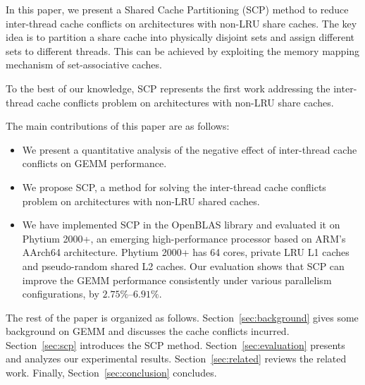 In this paper, we present a Shared Cache Partitioning (SCP) method
to reduce inter-thread cache conflicts on architectures with non-LRU share caches.
The key idea is to partition a
share cache into physically disjoint sets
and assign different sets to different threads. This can be achieved by
exploiting the memory mapping mechanism of set-associative caches.

To the best of our knowledge, SCP represents
the first work addressing
the inter-thread cache conflicts problem on
architectures with non-LRU share caches.

The main contributions of this paper are as follows:
\begin{itemize}
\item We present a quantitative analysis of the negative effect of inter-thread cache
  conflicts on GEMM performance.
\item We propose SCP, a method for solving the inter-thread cache conflicts
  problem on architectures with non-LRU shared caches.
\item We have implemented SCP in the OpenBLAS library and evaluated it on Phytium 2000+,
  an emerging high-performance processor based on ARM's AArch64 architecture.
  Phytium 2000+ has 64 cores, private LRU L1 caches
  and pseudo-random shared L2 caches.
  Our evaluation shows that SCP can improve the
  GEMM performance consistently
  under various parallelism configurations, by $2.75\%$--$6.91\%$.
\end{itemize}


The rest of the paper is organized as follows.
Section~\ref{sec:background} gives some background on GEMM and discusses
the cache conflicts incurred.
Section~\ref{sec:scp} introduces the SCP method.
Section~\ref{sec:evaluation} presents and
analyzes our experimental results.
Section~\ref{sec:related} reviews the related work.
Finally, Section~\ref{sec:conclusion} concludes.
